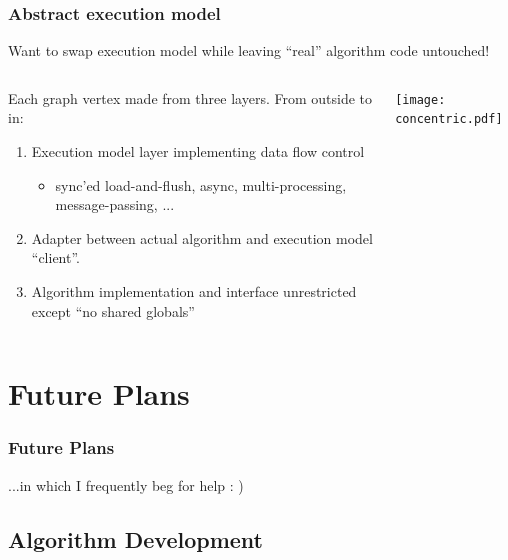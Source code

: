 \documentclass[xcolor=dvipsnames]{beamer}
\begin{document}
\begin{frame}
  \frametitle{Abstract execution model}

  \scriptsize Want to swap execution model while leaving ``real'' algorithm code untouched!

\footnotesize
  
  \begin{columns}
    \begin{column}{0.6\textwidth}
      Each graph vertex made from three layers.  From outside to in:
      \begin{enumerate}
      \item Execution model layer implementing data flow control
        \begin{itemize}\scriptsize
        \item sync'ed load-and-flush, async, multi-processing, message-passing, ...
        \end{itemize}
      \item Adapter between actual algorithm and execution model ``client''.
      \item Algorithm implementation and interface unrestricted except ``no shared
        globals'' 
      \end{enumerate}
    \end{column}
    \begin{column}{0.4\textwidth}
      \texttt{[image: concentric.pdf]}      
    \end{column}
  \end{columns}

\end{frame}

\section{Future Plans}

\begin{frame}
\end{frame}

\begin{frame}\frametitle{Future Plans}
  \begin{center}
    ...in which I frequently beg for help : )
  \end{center}
\end{frame}

\subsection{Algorithm Development}
\end{document}
